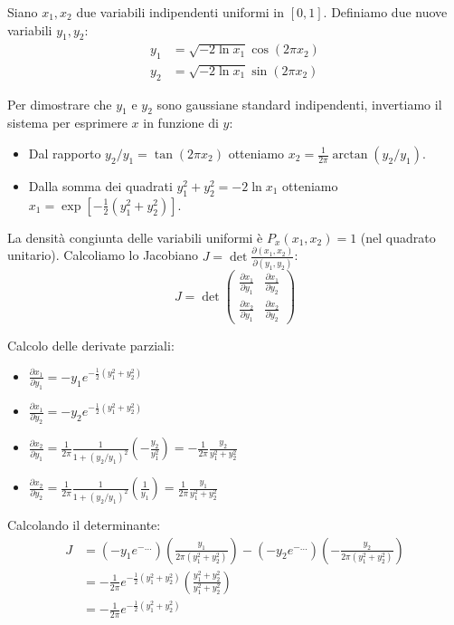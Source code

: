 \documentclass[openany,a4paper,12pt]{book}
\theoremstyle{remark}
\begin{document}
Siano $x_1, x_2$ due variabili indipendenti uniformi in $[0, 1]$. Definiamo due nuove variabili $y_1, y_2$:
\begin{align}
y_1 &= \sqrt{-2 \ln x_1} \cos(2\pi x_2) \\
y_2 &= \sqrt{-2 \ln x_1} \sin(2\pi x_2)
\end{align}

Per dimostrare che $y_1$ e $y_2$ sono gaussiane standard indipendenti, invertiamo il sistema per esprimere $x$ in funzione di $y$:
\begin{itemize}
    \item Dal rapporto $y_2/y_1 = \tan(2\pi x_2)$ otteniamo $x_2 = \frac{1}{2\pi} \arctan(y_2/y_1)$.
    \item Dalla somma dei quadrati $y_1^2 + y_2^2 = -2 \ln x_1$ otteniamo $x_1 = \exp\left[-\frac{1}{2}(y_1^2 + y_2^2)\right]$.
\end{itemize}

La densità congiunta delle variabili uniformi è $P_x(x_1, x_2) = 1$ (nel quadrato unitario).
Calcoliamo lo Jacobiano $J = \det \frac{\partial(x_1, x_2)}{\partial(y_1, y_2)}$:
\[
J = \det \begin{pmatrix}
\frac{\partial x_1}{\partial y_1} & \frac{\partial x_1}{\partial y_2} \\
\frac{\partial x_2}{\partial y_1} & \frac{\partial x_2}{\partial y_2}
\end{pmatrix}
\]

Calcolo delle derivate parziali:
\begin{itemize}
    \item $\frac{\partial x_1}{\partial y_1} = -y_1 e^{-\frac{1}{2}(y_1^2+y_2^2)}$
    \item $\frac{\partial x_1}{\partial y_2} = -y_2 e^{-\frac{1}{2}(y_1^2+y_2^2)}$
    \item $\frac{\partial x_2}{\partial y_1} = \frac{1}{2\pi} \frac{1}{1+(y_2/y_1)^2} \left(-\frac{y_2}{y_1^2}\right) = -\frac{1}{2\pi} \frac{y_2}{y_1^2+y_2^2}$
    \item $\frac{\partial x_2}{\partial y_2} = \frac{1}{2\pi} \frac{1}{1+(y_2/y_1)^2} \left(\frac{1}{y_1}\right) = \frac{1}{2\pi} \frac{y_1}{y_1^2+y_2^2}$
\end{itemize}

Calcolando il determinante:
\begin{align*}
J &= \left(-y_1 e^{-\dots}\right)\left(\frac{y_1}{2\pi(y_1^2+y_2^2)}\right) - \left(-y_2 e^{-\dots}\right)\left(-\frac{y_2}{2\pi(y_1^2+y_2^2)}\right) \\
&= -\frac{1}{2\pi} e^{-\frac{1}{2}(y_1^2+y_2^2)} \left( \frac{y_1^2 + y_2^2}{y_1^2 + y_2^2} \right) \\
&= -\frac{1}{2\pi} e^{-\frac{1}{2}(y_1^2+y_2^2)}
\end{align*}
\end{document}
